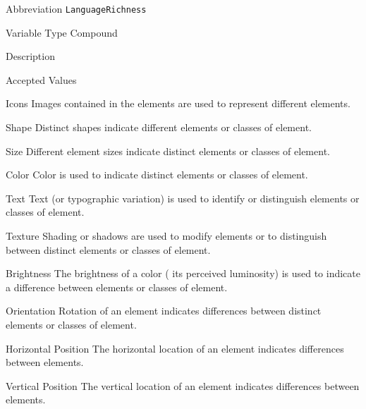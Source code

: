 \begin{AlignedDesc}
  \item[Abbreviation] \texttt{LanguageRichness}

  \item[Variable Type] Compound

  \item[Description]

  \item[Accepted Values]

  \begin{AlignedDesc}
    \item[Icons] Images contained in the elements are used to represent
    different elements.~\cite{costagliola2002,moody2009}
    \item[Shape] Distinct shapes indicate different elements or classes of
    element.~\cite{moody2009}
    \item[Size] Different element sizes indicate distinct elements or
    classes of element.~\cite{moody2009}
    \item[Color] Color is used to indicate distinct elements or classes of
    element.~\cite{moody2009}
    \item[Text] Text (or typographic variation) is used to identify or
    distinguish elements or classes of element.~\cite{moody2009}
    \item[Texture] Shading or shadows are used to modify elements or to
    distinguish between distinct elements or classes of
    element.~\cite{moody2009}
    \item[Brightness] The brightness of a color (\ie{} its perceived
    luminosity) is used to indicate a difference between elements or
    classes of element.~\cite{moody2009}
    \item[Orientation] Rotation of an element indicates differences between
    distinct elements or classes of element.~\cite{moody2009}
    \item[Horizontal Position] The horizontal location of an element
    indicates differences between elements.~\cite{moody2009}
    \item[Vertical Position] The vertical location of an element
    indicates differences between elements.~\cite{moody2009}
  \end{AlignedDesc}

\end{AlignedDesc}


